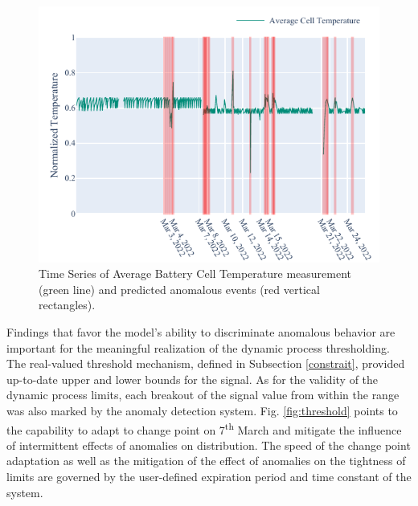 \begin{figure}[htbp]
\centerline{\includegraphics{figures/Average_Cell_Temperature_168_hours_sliding_anomalies.pdf}}
\caption{Time Series of Average Battery Cell Temperature measurement (green line) and predicted anomalous events (red vertical rectangles).}
\label{fig:anomalies}
\end{figure}

Findings that favor the model's ability to discriminate anomalous behavior are important for the meaningful realization of the dynamic process thresholding. The real-valued threshold mechanism, defined in Subsection \ref{constrait}, provided up-to-date upper and lower bounds for the signal. As for the validity of the dynamic process limits, each breakout of the signal value from within the range was also marked by the anomaly detection system. Fig. \ref{fig:threshold} points to the capability to adapt to change point on 7\textsuperscript{th} March and mitigate the influence of intermittent effects of anomalies on distribution. The speed of the change point adaptation as well as the mitigation of the effect of anomalies on the tightness of limits are governed by the user-defined expiration period and time constant of the system.


